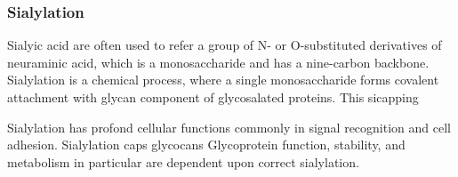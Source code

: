 \subsubsection {Sialylation}
Sialyic acid are often used to refer a group of N- or O-substituted derivatives of neuraminic acid, which is a monosaccharide and has a nine-carbon backbone.~\cite{Vocadlo_2009} Sialylation is a chemical process, where a single monosaccharide forms covalent attachment with glycan component of glycosalated proteins. This sicapping 

Sialylation has profond cellular functions commonly in signal recognition and cell adhesion. Sialylation caps glycocans Glycoprotein function, stability, and metabolism in particular are dependent upon correct sialylation.